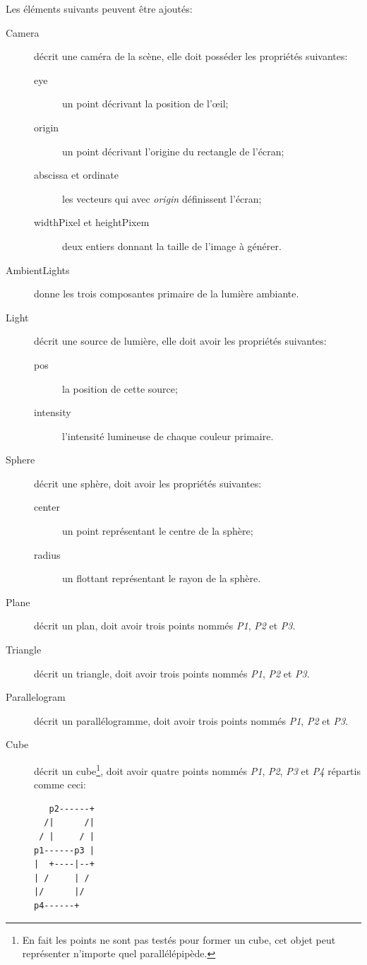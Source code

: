 \documentclass[a4paper]{article}
\begin{document}
    Les éléments suivants peuvent être ajoutés:
    \begin{description}
      \item[Camera] décrit une caméra de la scène, elle doit posséder les
        propriétés suivantes:
        \begin{description}
          \item[eye] un point décrivant la position de l'œil;
          \item[origin] un point décrivant l'origine du rectangle de l'écran;
          \item[abscissa et ordinate] les vecteurs qui avec \textit{origin}
            définissent l'écran;
          \item[widthPixel et heightPixem] deux entiers donnant la taille de
            l'image à générer. 
        \end{description}
      \item[AmbientLights] donne les trois composantes primaire de la lumière
        ambiante.
      \item[Light] décrit une source de lumière, elle doit avoir les propriétés
        suivantes:
        \begin{description}
          \item[pos] la position de cette source;
          \item[intensity] l'intensité lumineuse de chaque couleur primaire.
        \end{description}
      \item[Sphere] décrit une sphère, doit avoir les propriétés suivantes:
        \begin{description}
          \item[center] un point représentant le centre de la sphère;
          \item[radius] un flottant représentant le rayon de la sphère.
        \end{description}
      \item[Plane] décrit un plan, doit avoir trois points nommés \textit{P1},
        \textit{P2} et \textit{P3}.
      \item[Triangle] décrit un triangle, doit avoir trois points nommés
        \textit{P1}, \textit{P2} et \textit{P3}.
      \item[Parallelogram] décrit un parallélogramme, doit avoir trois points
        nommés \textit{P1}, \textit{P2} et \textit{P3}.
      \item[Cube] décrit un cube\footnote{En fait les points ne sont pas testés
        pour former un cube, cet objet peut représenter n'importe quel
        parallélépipède.}, doit avoir quatre points nommés
        \textit{P1}, \textit{P2}, \textit{P3} et \textit{P4} répartis comme
        ceci: \begin{lstlisting}
   p2------+
  /|      /|
 / |     / |
p1------p3 |
|  +----|--+
| /     | /
|/      |/
p4------+
        \end{lstlisting}
    \end{description}
\end{document}
